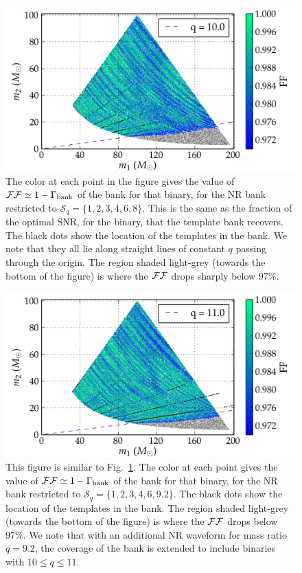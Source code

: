 \begin{figure}
\centering
\includegraphics[width=\columnwidth]{figures/nrhybbank/bank002_01_01_mtot200_match_cropped-tiny.png}
\caption{The color at each point in the figure gives the
value of $\mathcal{FF}\simeq 1-\Gamma_{\mathrm{bank}}$ of the bank for that binary, for
the NR bank restricted to $\mathcal{S}_q=\{1,2,3,4,6,8\}$. This is the
same as the fraction of the optimal SNR, for the binary, that the
template bank recovers. The black dots show
the location of the templates in the bank. We note that they all lie
along straight lines of constant $q$ passing through the origin. The region 
shaded light-grey (towards the bottom of the figure) is where the $\mathcal{FF}$ 
drops sharply below $97\%$.}
\label{fig:bank001_01_match}
\end{figure}
\begin{figure}
\centering
\includegraphics[width=\columnwidth]{figures/nrhybbank/bank006_01_mtot200_match_cropped-tiny.png}
\caption{This figure is similar to Fig.~\ref{fig:bank001_01_match}.
The color at each point gives the value of 
$\mathcal{FF}\simeq 1-\Gamma_{\mathrm{bank}}$ of the bank for that binary, for
the NR bank restricted to $\mathcal{S}_q=\{1,2,3,4,6,9.2\}$.
The black dots show the location of the templates in the bank. 
The region shaded light-grey (towards the bottom of the figure) is 
where the $\mathcal{FF}$ drops below $97\%$. We note that with an additional
NR waveform for mass ratio $q=9.2$, the coverage of the bank is 
extended to include binaries with $10\leq q\leq 11$.}
\label{fig:bank006_01_match}
\end{figure}
